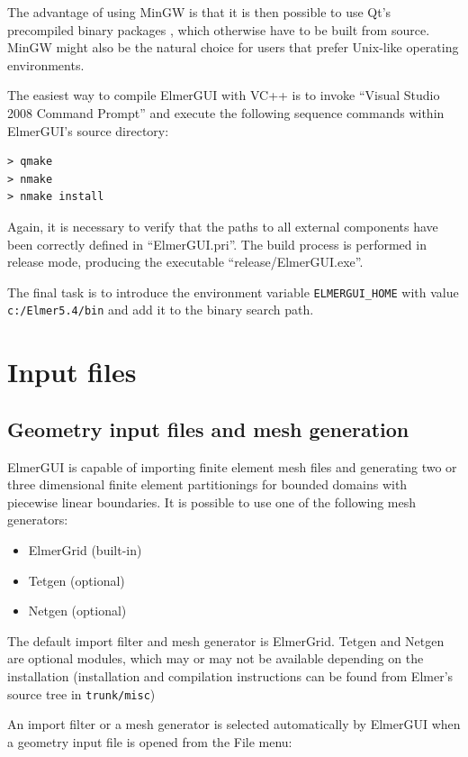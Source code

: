 \documentclass[a4paper,12pt]{article}
\begin{document}
The advantage of using MinGW is that it is then possible to use
Qt's precompiled binary packages \cite{QtHome}, which otherwise have to be built from source. MinGW
might also be the natural choice for users that prefer Unix-like operating environments.

The easiest way to compile ElmerGUI with VC++ is to invoke ``Visual Studio 2008 Command Prompt''
and execute the following sequence commands within ElmerGUI's source directory:
\begin{verbatim}
> qmake
> nmake
> nmake install
\end{verbatim}

Again, it is necessary to verify that the paths to all external components have been correctly
defined in ``ElmerGUI.pri''. The build process is performed in release mode, producing the
executable ``release/ElmerGUI.exe''.

The final task is to introduce the environment variable {\tt ELMERGUI\_HOME} with
value {\tt c:/Elmer5.4/bin} and add it to the binary search path.

\section{Input files}

\subsection{Geometry input files and mesh generation}

ElmerGUI is capable of importing finite element mesh files and generating two or three
dimensional finite element partitionings for bounded domains with piecewise linear
boundaries. It is possible to use one of the following mesh generators:
\begin{itemize}
 \item ElmerGrid (built-in)
 \item Tetgen (optional)
 \item Netgen (optional)
\end{itemize}
The default import filter and mesh generator is ElmerGrid. Tetgen and Netgen are optional
modules, which may or may not be available depending on the installation (installation and
compilation instructions can be found from Elmer's source tree in {\tt trunk/misc})

An import filter or a mesh generator is selected automatically by ElmerGUI when a geometry
input file is opened from the File menu:
\end{document}
